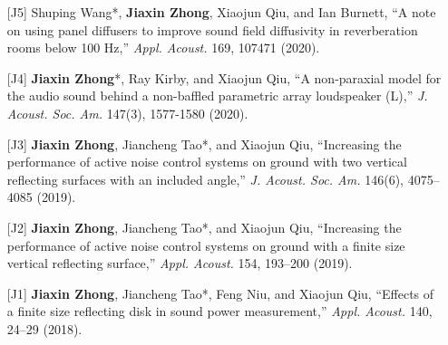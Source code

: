 \documentclass[10pt,a4paper,ragged2e,withhyper]{altacv}
\newcommand{\PubJournal}[1]{\textit{#1}}
\newcommand{\PubTitle}[1]{``{#1,}''}
\newcommand{\PubCorAuthor}[1]{#1*}
\begin{document}
\begin{paracol}{1}
\begin{itemize}[leftmargin = 30pt]
    \item[{[J5]}] \PubCorAuthor{Shuping Wang}, \textbf{Jiaxin Zhong}, Xiaojun Qiu, and Ian Burnett, 
        \PubTitle{A note on using panel diffusers to improve sound field diffusivity in reverberation rooms below 100 Hz}
    \PubJournal{Appl. Acoust.} 
    169, 107471 (2020).
        \href{https://doi.org/10.1016/j.apacoust.2020.107471}{\color{accent}\aiDoi}
        \href{https://github.com/JiaxinZhong/JiaxinZhong.github.io/raw/master/publications/journal/Wang2020-AA-Diffuser.pdf}{\color{accent}\faFilePdf[regular]}

    \item[{[J4]}] \PubCorAuthor{\textbf{Jiaxin Zhong}}, Ray Kirby, and Xiaojun Qiu,
        \PubTitle{A non-paraxial model for the audio sound behind a non-baffled parametric array loudspeaker (L)}
        \PubJournal{J. Acoust. Soc. Am.}
        147(3), 1577-1580 (2020).
        \href{https://doi.org/10.1121/10.0000793}{\color{accent}\aiDoi}
        \href{https://github.com/JiaxinZhong/JiaxinZhong.github.io/raw/master/publications/journal/Zhong2020-JASA-PAL_disk.pdf}{\color{accent}\faFilePdf[regular]}

    \item[{[J3]}] \textbf{Jiaxin Zhong}, \PubCorAuthor{Jiancheng Tao}, and Xiaojun Qiu, 
        \PubTitle{Increasing the performance of active noise control systems on ground with two vertical reflecting surfaces with an included angle} 
        \PubJournal{J. Acoust. Soc. Am.}
        146(6), 4075--4085 (2019).
        \href{https://doi.org/10.1121/1.5134062}{\color{accent}\aiDoi}
        \href{https://github.com/JiaxinZhong/JiaxinZhong.github.io/raw/master/publications/journal/Zhong2019-JASA-ANC_surface_included_angle.pdf}{\color{accent}\faFilePdf[regular]}

    \item[{[J2]}] \textbf{Jiaxin Zhong}, \PubCorAuthor{Jiancheng Tao}, and Xiaojun Qiu,
        \PubTitle{Increasing the performance of active noise control systems on ground with a finite size vertical reflecting surface}
        \PubJournal{Appl. Acoust.} 
        154, 193--200 (2019).
        \href{https://doi.org/10.1016/j.apacoust.2019.05.002}{\color{accent}\aiDoi}
        \href{https://github.com/JiaxinZhong/JiaxinZhong.github.io/raw/master/publications/journal/Zhong2019-AA-ANC_finite_size_surface.pdf}{\color{accent}\faFilePdf[regular]}

    \item[{[J1]}] \textbf{Jiaxin Zhong}, \PubCorAuthor{Jiancheng Tao}, Feng Niu, and Xiaojun Qiu,
        \PubTitle{Effects of a finite size reflecting disk in sound power measurement}
        \PubJournal{Appl. Acoust.}
        140, 24--29 (2018).
        \href{https://doi.org/10.1016/j.apacoust.2018.05.007}{\color{accent}\aiDoi}
        \href{https://github.com/JiaxinZhong/JiaxinZhong.github.io/raw/master/publications/journal/Zhong2018-AA-Sound_power.pdf}{\color{accent}\faFilePdf[regular]}
\end{itemize}



\end{paracol}
\end{document}
